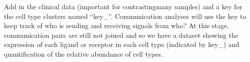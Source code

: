 \documentclass[
]{article}
\newenvironment{Shaded}{\begin{snugshade}}{\end{snugshade}}
\newcommand{\AttributeTok}[1]{\textcolor[rgb]{0.77,0.63,0.00}{#1}}
\newcommand{\CommentTok}[1]{\textcolor[rgb]{0.56,0.35,0.01}{\textit{#1}}}
\newcommand{\DecValTok}[1]{\textcolor[rgb]{0.00,0.00,0.81}{#1}}
\newcommand{\DocumentationTok}[1]{\textcolor[rgb]{0.56,0.35,0.01}{\textbf{\textit{#1}}}}
\newcommand{\ErrorTok}[1]{\textcolor[rgb]{0.64,0.00,0.00}{\textbf{#1}}}
\newcommand{\FunctionTok}[1]{\textcolor[rgb]{0.00,0.00,0.00}{#1}}
\newcommand{\NormalTok}[1]{#1}
\newcommand{\OtherTok}[1]{\textcolor[rgb]{0.56,0.35,0.01}{#1}}
\newcommand{\SpecialCharTok}[1]{\textcolor[rgb]{0.00,0.00,0.00}{#1}}
\newcommand{\StringTok}[1]{\textcolor[rgb]{0.31,0.60,0.02}{#1}}
\begin{document}
Add in the clinical data (important for contrastingmany samples) and a
key for the cell type clusters named ``key\_''. Communication analyses
will use the key to keep track of who is sending and receiving signals
from who? At this stage, communication pairs are still not joined and so
we have a dataset showing the expression of each ligand or receptor in
each cell type (indicated by key\_) and quantification of the relative
abundance of cell types.

\begin{Shaded}
\end{Shaded}
\end{document}
